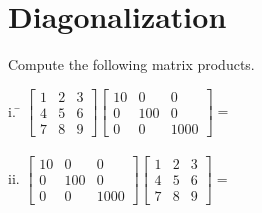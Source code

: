 \section{Diagonalization}    \label{Diagonalization}

\begin{myexa}[\bd{a}]
	Compute the following matrix products.
	\begin{tabbing}
		\indent   i. \space  \=  $\left[ \begin{array}{rrr} 1 & 2 & 3 \\ 4 & 5 & 6 \\ 7 & 8 & 9 \end{array} \right]\left[ \begin{array}{ccc} 10 & 0 & 0 \\ 0 & 100 & 0 \\ 0 & 0 & 1000 \end{array} \right]=$ \\
	\\
		\indent  ii. \>  $\left[ \begin{array}{ccc} 10 & 0 & 0 \\ 0 & 100 & 0 \\ 0 & 0 & 1000 \end{array} \right]\left[ \begin{array}{rrr} 1 & 2 & 3 \\ 4 & 5 & 6 \\ 7 & 8 & 9 \end{array} \right]=$  \\
	\end{tabbing}
\end{myexa} 

